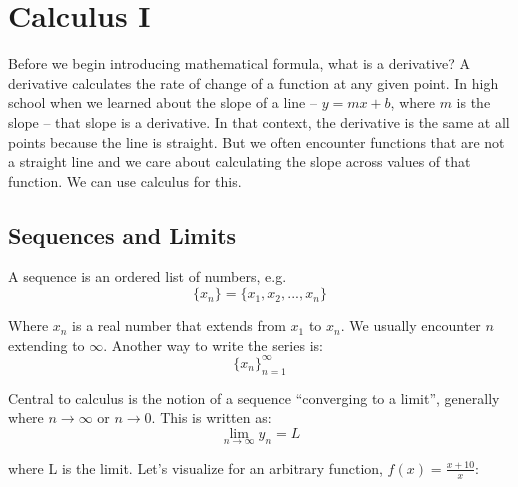 \section{Calculus I}

Before we begin introducing mathematical formula, what is a derivative? A derivative calculates the rate of change of a function at any given point. In high school when we learned about the slope of a line -- $y = mx + b$, where $m$ is the slope -- that slope is a derivative. In that context, the derivative is the same at all points because the line is straight. But we often encounter functions that are not a straight line and we care about calculating the slope across values of that function. We can use calculus for this.


\subsection{Sequences and Limits}

A sequence is an ordered list of numbers, e.g.
\begin{equation*}
    \{x_n\} = \{x_1, x_2, ..., x_n\}
\end{equation*}

\noindent Where $x_n$ is a real number that extends from $x_1$ to $x_n$. We usually encounter $n$ extending to $\infty$. Another way to write the series is:
\begin{equation*}
    \{x_n\}_{n=1}^\infty
\end{equation*}

\noindent Central to calculus is the notion of a sequence ``converging to a limit'', generally where $n \rightarrow \infty$ or $n \rightarrow 0$. This is written as:
\begin{equation*}
    \lim_{n \rightarrow \infty} y_n = L
\end{equation*}

\noindent where L is the limit. Let's visualize for an arbitrary function, $f(x) = \frac{x + 10}{x}$:

